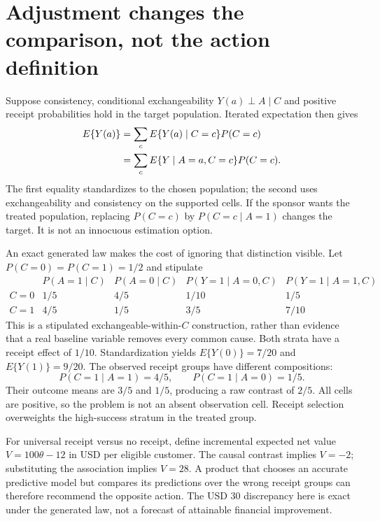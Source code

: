 \section{Adjustment changes the comparison, not the action definition}
\label{exec17:s3-adjust}

Suppose consistency, conditional exchangeability
$Y(a)\mathrel{\perp}A\mid C$ and positive receipt probabilities hold in the
target population. Iterated expectation then gives
\begin{align}
 E\{Y(a)\}
 &=\sum_c E\{Y(a)\mid C=c\}P(C=c) \notag\\
 &=\sum_c E\{Y\mid A=a,C=c\}P(C=c).
 \label{exec17:s3-adjustment}
\end{align}
The first equality standardizes to the chosen population; the second uses
exchangeability and consistency on the supported cells. If the sponsor wants
the treated population, replacing $P(C=c)$ by $P(C=c\mid A=1)$ changes the
target. It is not an innocuous estimation option.

An exact generated law makes the cost of ignoring that distinction visible.
Let $P(C=0)=P(C=1)=1/2$ and stipulate
\[
\begin{array}{c|cc|cc}
 &P(A=1\mid C)&P(A=0\mid C)
 &P(Y=1\mid A=0,C)&P(Y=1\mid A=1,C)\\ \hline
 C=0&1/5&4/5&1/10&1/5\\
 C=1&4/5&1/5&3/5&7/10
\end{array}
\]
This is a stipulated exchangeable-within-$C$ construction, rather than
evidence that a real baseline variable removes every common cause.
Both strata have a receipt effect of $1/10$. Standardization yields
$E\{Y(0)\}=7/20$ and $E\{Y(1)\}=9/20$.
The observed receipt groups have different compositions:
\[
 P(C=1\mid A=1)=4/5,\qquad P(C=1\mid A=0)=1/5.
\]
Their outcome means are $3/5$ and $1/5$, producing a raw contrast of
$2/5$. All cells are positive, so the problem is not an absent observation
cell. Receipt selection overweights the high-success stratum in the
treated group.~\citep{exec17_s3_exact}

For universal receipt versus no receipt, define incremental expected
net value $V=100\theta-12$ in USD per eligible customer. The causal contrast
implies $V=-2$; substituting the association implies $V=28$.
A product that chooses an accurate predictive model but compares its
predictions over the wrong receipt groups can therefore recommend the
opposite action. The USD 30 discrepancy here is exact under the generated
law, not a forecast of attainable financial improvement.

